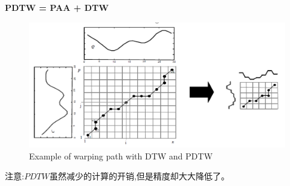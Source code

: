 \documentclass[UTF8,a4paper]{ctexart}
\newcommand{\spaceline}{\vspace{\baselineskip}}
\begin{document}
  \spaceline
  \textbf{PDTW = PAA + DTW}
  \begin{figure}[H]
    \centering
    \includegraphics[scale = 0.3]{assets/DynamicTimeWarping(DTW)_35d0b.png}
    \caption{Example of warping path with DTW and PDTW}
  \end{figure}

  注意:$PDTW$虽然减少的计算的开销,但是精度却大大降低了。
\end{document}
